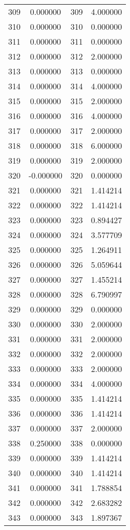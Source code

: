 \documentclass[12pt]{article}
\begin{document}
\begin{longtable}{@{}cccc@{}}
309 & 0.000000 & 309 & 4.000000 \\
310 & 0.000000 & 310 & 0.000000 \\
311 & 0.000000 & 311 & 0.000000 \\
312 & 0.000000 & 312 & 2.000000 \\
313 & 0.000000 & 313 & 0.000000 \\
314 & 0.000000 & 314 & 4.000000 \\
315 & 0.000000 & 315 & 2.000000 \\
316 & 0.000000 & 316 & 4.000000 \\
317 & 0.000000 & 317 & 2.000000 \\
318 & 0.000000 & 318 & 6.000000 \\
319 & 0.000000 & 319 & 2.000000 \\
320 & -0.000000 & 320 & 0.000000 \\
321 & 0.000000 & 321 & 1.414214 \\
322 & 0.000000 & 322 & 1.414214 \\
323 & 0.000000 & 323 & 0.894427 \\
324 & 0.000000 & 324 & 3.577709 \\
325 & 0.000000 & 325 & 1.264911 \\
326 & 0.000000 & 326 & 5.059644 \\
327 & 0.000000 & 327 & 1.455214 \\
328 & 0.000000 & 328 & 6.790997 \\
329 & 0.000000 & 329 & 0.000000 \\
330 & 0.000000 & 330 & 2.000000 \\
331 & 0.000000 & 331 & 2.000000 \\
332 & 0.000000 & 332 & 2.000000 \\
333 & 0.000000 & 333 & 2.000000 \\
334 & 0.000000 & 334 & 4.000000 \\
335 & 0.000000 & 335 & 1.414214 \\
336 & 0.000000 & 336 & 1.414214 \\
337 & 0.000000 & 337 & 2.000000 \\
338 & 0.250000 & 338 & 0.000000 \\
339 & 0.000000 & 339 & 1.414214 \\
340 & 0.000000 & 340 & 1.414214 \\
341 & 0.000000 & 341 & 1.788854 \\
342 & 0.000000 & 342 & 2.683282 \\
343 & 0.000000 & 343 & 1.897367 \\

\end{longtable}
\end{document}
